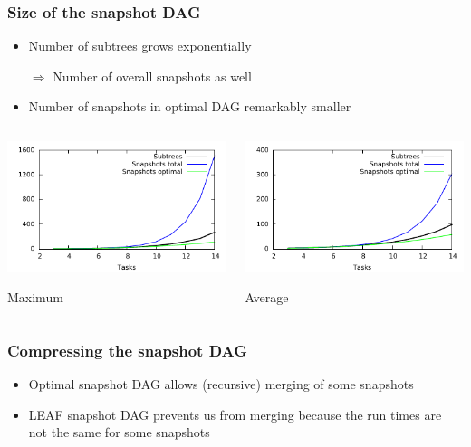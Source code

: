 \documentclass{beamer}
\newcommand{\todo}[1]{ {\color{red}{#1} }}
\begin{document}
\begin{frame}
  \frametitle{Size of the snapshot DAG}
  \begin{itemize}
  \item Number of subtrees grows exponentially
    
    $\Rightarrow$ Number of overall snapshots as well
  \item Number of snapshots in optimal DAG remarkably smaller
  \end{itemize}
  \begin{columns}
    \begin{column}{.5\textwidth}
      \centering
      \includegraphics[scale=.8]{max.pdf}
      
      Maximum
    \end{column}
    \begin{column}{.5\textwidth}
      \centering
      \includegraphics[scale=.8]{avg.pdf}
      
      Average
    \end{column}
  \end{columns}
\end{frame}

\begin{frame}
  \frametitle{Compressing the snapshot DAG}
  \begin{itemize}
  \item Optimal snapshot DAG allows (recursive) merging of some snapshots
  \item LEAF snapshot DAG prevents us from merging because the run times are not the same for some snapshots \todo{Verbessern!}
  \end{itemize}
\end{frame}
\end{document}
